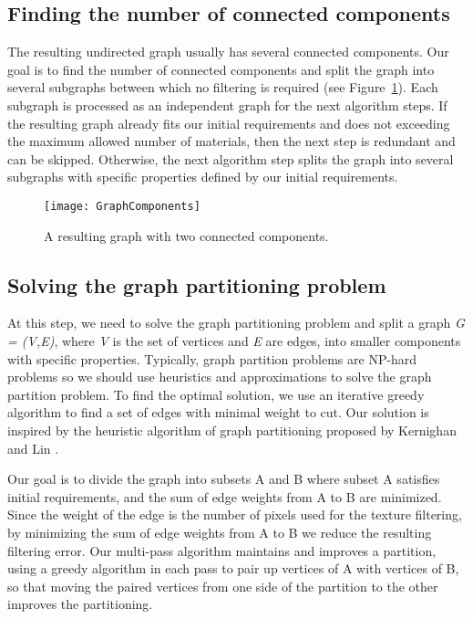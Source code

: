 \subsection{Finding the number of connected components}

The resulting undirected graph usually has several connected components.
Our goal is to find the number of connected components and split the graph into several subgraphs between which no filtering is required (see Figure~\ref{Makeev-GraphComponents}).
Each subgraph is processed as an independent graph for the next algorithm steps.
If the resulting graph already fits our initial requirements and does not exceeding the maximum allowed number of materials, then the next step is redundant and can be skipped.
Otherwise, the next algorithm step splits the graph into several subgraphs with specific properties defined by our initial requirements.

\begin{figure}\centering
\texttt{[image: GraphComponents]}
\caption{A resulting graph with two connected components.}
\label{Makeev-GraphComponents}
\end{figure}

\subsection{Solving the graph partitioning problem}
\label{Makeev-SolveGraphPartition}

At this step, we need to solve the graph partitioning problem and split a graph \emph{G = (V,E)}, where \emph{V} is the set of vertices and \emph{E} are edges, into smaller components with specific properties.
Typically, graph partition problems are NP-hard problems so we should use heuristics and approximations to solve the graph partition problem.
To find the optimal solution, we use an iterative greedy algorithm to find a set of edges with minimal weight to cut.
Our solution is inspired by the heuristic algorithm of graph partitioning proposed by Kernighan and Lin \cite{KernighanLin}.

Our goal is to divide the graph into subsets A and B where subset A satisfies initial requirements, and the sum of edge weights from A to B are minimized.
Since the weight of the edge is the number of pixels used for the texture filtering, by minimizing the sum of edge weights from A to B we reduce the resulting filtering error.
Our multi-pass algorithm maintains and improves a partition, using a greedy algorithm in each pass to pair up vertices of A with vertices of B, so that moving the paired vertices from one side of the partition to the other improves the partitioning.

